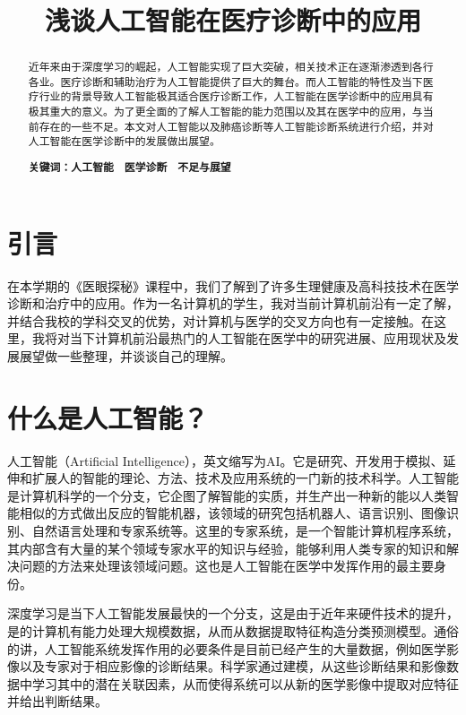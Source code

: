 \documentclass{xcumcmart}
\title{浅谈人工智能在医疗诊断中的应用}
\begin{document}
\renewcommand\arraystretch{2}
\maketitle

\begin{abstract}
    \par 近年来由于深度学习的崛起，人工智能实现了巨大突破，相关技术正在逐渐渗透到各行各业。医疗诊断和辅助治疗为人工智能提供了巨大的舞台。而人工智能的特性及当下医疗行业的背景导致人工智能极其适合医疗诊断工作，人工智能在医学诊断中的应用具有极其重大的意义。为了更全面的了解人工智能的能力范围以及其在医学中的应用，与当前存在的一些不足。本文对人工智能以及肺癌诊断等人工智能诊断系统进行介绍，并对人工智能在医学诊断中的发展做出展望。
    \newline
    \par\textbf{关键词：人工智能　医学诊断　不足与展望}    
    \end{abstract}

\section{引言}
\par 在本学期的《医眼探秘》课程中，我们了解到了许多生理健康及高科技技术在医学诊断和治疗中的应用。作为一名计算机的学生，我对当前计算机前沿有一定了解，并结合我校的学科交叉的优势，对计算机与医学的交叉方向也有一定接触。在这里，我将对当下计算机前沿最热门的人工智能在医学中的研究进展、应用现状及发展展望做一些整理，并谈谈自己的理解。


\section{什么是人工智能？}
\par 人工智能（Artificial Intelligence），英文缩写为AI。它是研究、开发用于模拟、延伸和扩展人的智能的理论、方法、技术及应用系统的一门新的技术科学。人工智能是计算机科学的一个分支，它企图了解智能的实质，并生产出一种新的能以人类智能相似的方式做出反应的智能机器，该领域的研究包括机器人、语言识别、图像识别、自然语言处理和专家系统等\cite{1}。这里的专家系统，是一个智能计算机程序系统，其内部含有大量的某个领域专家水平的知识与经验，能够利用人类专家的知识和解决问题的方法来处理该领域问题。这也是人工智能在医学中发挥作用的最主要身份。
\par 深度学习是当下人工智能发展最快的一个分支，这是由于近年来硬件技术的提升，是的计算机有能力处理大规模数据，从而从数据提取特征构造分类预测模型。通俗的讲，人工智能系统发挥作用的必要条件是目前已经产生的大量数据，例如医学影像以及专家对于相应影像的诊断结果。科学家通过建模，从这些诊断结果和影像数据中学习其中的潜在关联因素，从而使得系统可以从新的医学影像中提取对应特征并给出判断结果。
\end{document}
